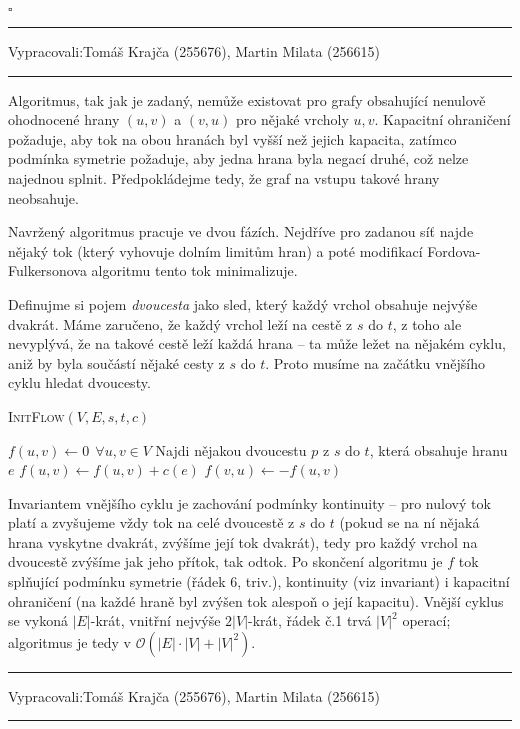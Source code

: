 \documentclass[12pt]{article}
\newcommand{\la}{\leftarrow}
\renewcommand{\O}{\mathcal{O}}
\newcommand{\zadani}[2]{
{\large
\noindent {\bf IB108 \hfill{} Sada #1, Příklad #2 \\[-4mm]}
\noindent\hrule
\vspace{2mm}
\noindent Vypracovali:\hfill{}Tomáš Krajča (255676), Martin Milata (256615)
\vspace{3mm}
\hrule
\bigskip\bigskip}
}
\begin{document}
\hfill$\square$

\clearpage
\zadani{3}{3}

\noindent
Algoritmus, tak jak je zadaný, nemůže existovat pro grafy obsahující nenulově ohodnocené hrany $(u,v)$
a $(v,u)$ pro nějaké vrcholy $u,v$. Kapacitní ohraničení požaduje, aby tok na obou hranách byl vyšší než
jejich kapacita, zatímco podmínka symetrie požaduje, aby jedna hrana byla negací druhé, což nelze
najednou splnit. Předpokládejme tedy, že graf na vstupu takové hrany neobsahuje.

Navržený algoritmus pracuje ve dvou fázích. Nejdříve pro zadanou síť najde nějaký tok (který
vyhovuje dolním limitům hran) a poté modifikací Fordova-Fulkersonova algoritmu tento tok
minimalizuje.

Definujme si pojem \emph{dvoucesta} jako sled, který každý vrchol obsahuje nejvýše dvakrát. Máme
zaručeno, že každý vrchol leží na cestě z $s$ do $t$, z toho ale nevyplývá, že na takové cestě leží
každá hrana -- ta může ležet na nějakém cyklu, aniž by byla součástí nějaké cesty z $s$ do $t$.
Proto musíme na začátku vnějšího cyklu hledat dvoucesty.

\begin{algorithm}
\textsc{InitFlow}$(V,E,s,t,c)$
\begin{algorithmic}[1]
\STATE $f(u,v) \la 0 \ \ \forall u,v \in V$
\STATE Najdi nějakou dvoucestu $p$ z $s$ do $t$, která obsahuje hranu $e$
\STATE $f(u,v) \la f(u,v) + c(e)$
\STATE $f(v,u) \la -f(u,v)$
\ENDFOR
\ENDFOR
\end{algorithmic}
\end{algorithm}

\noindent
Invariantem vnějšího cyklu je zachování podmínky kontinuity -- pro nulový tok platí a zvyšujeme vždy
tok na celé dvoucestě z $s$ do $t$ (pokud se na ní nějaká hrana vyskytne dvakrát, zvýšíme její tok
dvakrát), tedy pro každý vrchol na dvoucestě zvýšíme jak jeho přítok, tak odtok. Po skončení
algoritmu je $f$ tok splňující podmínku symetrie (řádek 6, triv.), kontinuity (viz invariant) i
kapacitní ohraničení (na každé hraně byl zvýšen tok alespoň o její kapacitu). Vnější cyklus se vykoná
$|E|$-krát, vnitřní nejvýše $2|V|$-krát, řádek č.1 trvá $|V|^2$ operací; algoritmus je tedy v
$\O(|E|\cdot|V| + |V|^2)$.


\clearpage
\zadani{3}{3}
\end{document}
